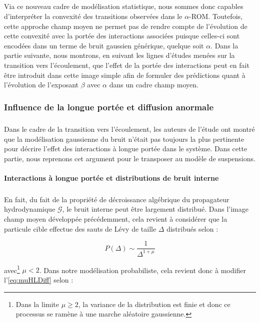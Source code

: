 \subparagraph{}Via ce nouveau cadre de modélisation statistique, nous sommes donc capables d'interpréter la convexité des transitions observées dans le $\alpha$-ROM. Toutefois, cette approche champ moyen ne permet pas de rendre compte de l'évolution de cette convexité avec la portée des interactions associées puisque celles-ci sont encodées dans un terme de bruit gaussien générique, quelque soit $\alpha$. Dans la partie suivante, nous montrons, en suivant les lignes d'études menées sur la transition vers l'écoulement, que l'effet de la portée des interactions peut en fait être introduit dans cette image simple afin de formuler des prédictions quant à l'évolution de l'exposant $\beta$ avec $\alpha$ dans un cadre champ moyen.
 
\subsubsection{Influence de la longue portée et diffusion anormale}

\label{sec:LPHL}

\subparagraph{}Dans le cadre de la transition vers l'écoulement, les auteurs de l'étude \cite{lin_mean-field_2016} ont montré que la modélisation gaussienne du bruit n'était pas toujours la plus pertinente pour décrire l'effet des interactions à longue portée dans le système. Dans cette partie, nous reprenons cet argument pour le transposer au modèle de suspensions.

\paragraph{Interactions à longue portée et distributions de bruit interne}

\subparagraph{}En fait, du fait de la propriété de décroissance algébrique du propagateur hydrodynamique $ \mathcal{G}$, le bruit interne peut être largement distribué. Dans l'image champ moyen développée précédemment, cela revient à considérer que la particule cible effectue des sauts de Lévy de taille $\Delta$ distribués selon :

\begin{equation}
	P(\Delta) \sim \frac{1}{\Delta^{1+\mu}}
\end{equation}

\noindent avec\footnote{Dans la limite $\mu \geq 2$, la variance de la distribution est finie et donc ce processus se ramène à une marche aléatoire gaussienne.} $\mu < 2$. Dans notre modélisation probabiliste, cela revient donc à modifier l'\autoref{eq:muHLDiff} selon :

